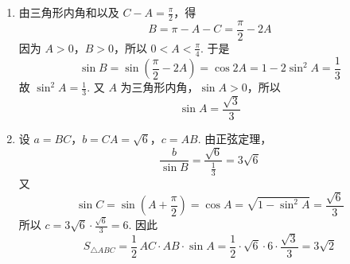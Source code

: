 \begin{solution}
\begin{enumerate}
\item 由三角形内角和以及 \(C-A=\frac{\pi}{2}\)，得
\[
B=\pi-A-C=\frac{\pi}{2}-2A
\]
因为 \(A>0\)，\(B>0\)，所以 \(0<A<\frac{\pi}{4}\). 于是
\[
\sin B=\sin\left(\frac{\pi}{2}-2A\right)=\cos 2A
=1-2\sin^2 A=\frac{1}{3}
\]
故 \(\sin^2 A=\frac{1}{3}\). 又 \(A\) 为三角形内角，\(\sin A>0\)，所以
\[
\sin A=\frac{\sqrt{3}}{3}
\]
\item 设 \(a=BC\)，\(b=CA=\sqrt{6}\)，\(c=AB\). 由正弦定理，
\[
\frac{b}{\sin B}=\frac{\sqrt{6}}{\frac{1}{3}}=3\sqrt{6}
\]
又
\[
\sin C=\sin\left(A+\frac{\pi}{2}\right)=\cos A
=\sqrt{1-\sin^2 A}=\frac{\sqrt{6}}{3}
\]
所以 \(c=3\sqrt{6}\cdot\frac{\sqrt{6}}{3}=6\). 因此
\[
S_{\triangle ABC}=\frac{1}{2}\,AC\cdot AB\cdot\sin A
=\frac{1}{2}\cdot\sqrt{6}\cdot6\cdot\frac{\sqrt{3}}{3}
=3\sqrt{2}
\]
\end{enumerate}
\end{solution}

